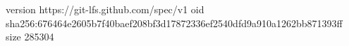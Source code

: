 version https://git-lfs.github.com/spec/v1
oid sha256:676464e2605b7f40baef208bf3d17872336ef2540dfd9a910a1262bb871393ff
size 285304
